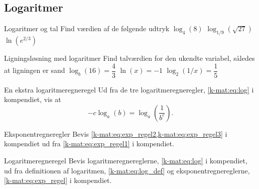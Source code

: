 \subsection*{Logaritmer}
\begin{opgave}[1]{Logaritmer og tal}
    Find værdien af de følgende udtryk
    \opg $\log_{4}(8)$
    \opg $\log_{1/9}\left(\sqrt{27}\right)$
    \opg $\ln(e^{2/3})$
\end{opgave}
\begin{opgave}[2]{Ligningsløsning med logaritmer}
Find talværdien for den ukendte variabel, således at ligningen er sand
    \opg $\log_{b}(16) = \dfrac{4}{3}$
    \opg $\ln(x) = -1$
    \opg $\log_{2}(1/x)=\dfrac{1}{5}$
\end{opgave}
\begin{opgave}[3]{En ekstra logaritmeregneregel}
    Ud fra de tre logaritmeregneregler, \cref{k-mat:eq:log} i kompendiet, vis at
    $$
    -c\log_a(b)=\log_a\left(\frac{1}{b^c}\right).
    $$
\end{opgave}
\begin{opgave}[4]{Eksponentregneregler}
    Bevis \cref{k-mat:eq:exp_regel2,k-mat:eq:exp_regel3} i kompendiet ud fra \cref{k-mat:eq:exp_regel1} i kompendiet. 
\end{opgave}
\begin{opgave}[4]{Logaritmeregneregel}
    Bevis logaritmeregnereglerne, \cref{k-mat:eq:log} i kompendiet, ud fra definitionen af logaritmen, \cref{k-mat:eq:log_def} og eksponentregnereglerne, \cref{k-mat:eq:exp_regel} i kompendiet.
\end{opgave}